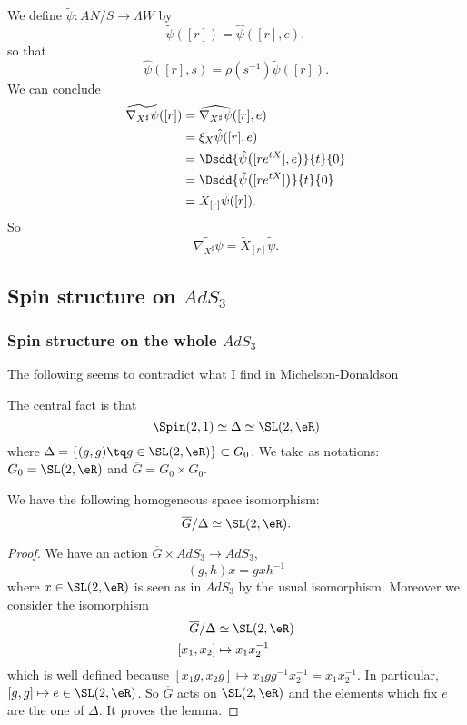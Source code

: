 We define $\tilde{\psi}\colon AN/S\to \Lambda W$ by 
\[ 
  \tilde{\psi}([r])=\hat{\psi}( [r],e ),
\]
so that
\begin{equation}
\hat{\psi}([r],s)=\rho(s^{-1})\tilde{\psi}([r]).
\end{equation}
We can conclude
\[ 
\begin{split}
\widetilde{ \nabla_{X^{\sharp}}\psi  }([r])&=\widehat{\nabla_{X^{\sharp}}\psi}([r],e)\\
        &=\xi_{X}\hat{\psi}([r],e)\\
        &=\Dsdd{ \hat{\psi}\big( [r e^{tX}],e \big) }{t}{0}\\
        &=\Dsdd{ \tilde{\psi}\big( [r e^{tX}] \big) }{t}{0}\\
        &=\tilde X_{[r]}\tilde{\psi}([r]).      
\end{split}  
\]
So
\begin{equation}
\widetilde{\nabla_{X^{\sharp}}\psi}=\tilde X_{[r]}\tilde{\psi}.
\end{equation}

\subsection{Spin structure on \texorpdfstring{$AdS_3$}{AdS3} }

\subsubsection{Spin structure on the whole \texorpdfstring{$AdS_3$}{AdS3} }

\begin{probleme}
    The following seems to contradict what I find in Michelson-Donaldson
\end{probleme}
The central fact is that
\[ 
  \Spin(2,1)\simeq\Delta\simeq\SL(2,\eR)
\]
where $\Delta=\{ (g,g)\tq g\in\SL(2,\eR) \}\subset G_0$. We take as notations: $G_{0}=\SL(2,\eR)$ and $\overline{G}=G_0\times G_{0}$. 

\begin{lemma}
We have the following homogeneous space isomorphism:
\[ 
  \overline{G}/\Delta\simeq\SL(2,\eR).
\]
\end{lemma}

\begin{proof} 

We have an action $\overline{G}\times AdS_3\to AdS_3$,
\begin{equation} \label{EqActghgxh}
  (g,h)x=gxh^{-1}
\end{equation}
where $x\in\SL(2,\eR)$ is seen as in $AdS_3$ by the usual isomorphism. Moreover we consider the isomorphism
\begin{align}
\overline{G}/\Delta&\simeq\SL(2,\eR)\\
[x_1,x_2]&\mapsto x_1x_2^{-1}
\end{align}
which is well defined because $[x_1g,x_2g]\mapsto x_1gg^{-1}x_2^{-1}=x_1x_2^{-1}$. In particular, $[g,g]\mapsto e\in\SL(2,\eR)$. So $\overline{G}$ acts on $\SL(2,\eR)$ and the elements which fix $e$ are the one of $\Delta$. It proves the lemma.
\end{proof}

